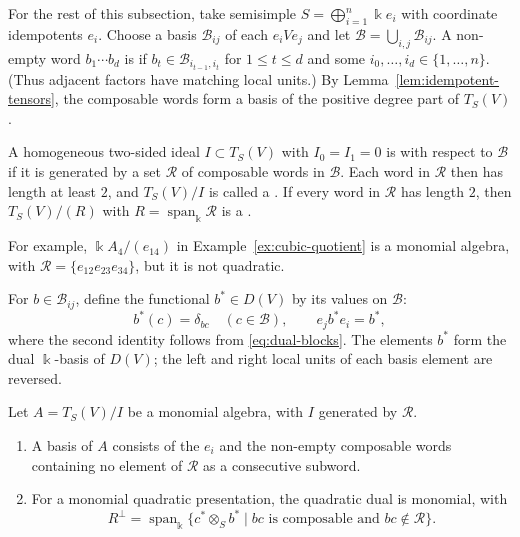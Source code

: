 For the rest of this subsection, take semisimple $S=\bigoplus_{i=1}^n\Bbbk e_i$ with coordinate idempotents $e_i$.
Choose a basis $\mathcal B_{ij}$ of each $e_iVe_j$ and let $\mathcal B=\bigcup_{i,j}\mathcal B_{ij}$.
A non-empty word $b_1\cdots b_d$ is  if $b_t\in\mathcal B_{i_{t-1},i_t}$ for $1\leq t\leq d$ and some $i_0,\ldots,i_d\in\{1,\ldots,n\}$.
(Thus adjacent factors have matching local units.)
By Lemma~\ref{lem:idempotent-tensors}, the composable words form a basis of the positive degree part of $T_S(V)$.

\begin{definition}\label{def:monomial}
A homogeneous two-sided ideal $I\subset T_S(V)$ with $I_0=I_1=0$ is  with respect to $\mathcal B$ if it is generated by a set $\mathcal R$ of composable words in $\mathcal B$.
Each word in $\mathcal R$ then has length at least $2$, and $T_S(V)/I$ is called a .
If every word in $\mathcal R$ has length $2$, then $T_S(V)/(R)$ with $R=\operatorname{span}_\Bbbk\mathcal R$ is a .
\end{definition}

For example, $\Bbbk A_4/(e_{14})$ in Example~\ref{ex:cubic-quotient} is a monomial algebra, with $\mathcal R=\{e_{12}e_{23}e_{34}\}$, but it is not quadratic.

For $b\in\mathcal B_{ij}$, define the functional $b^*\in D(V)$ by its values on $\mathcal B$:
\begin{equation}\label{eq:dual-basis-idempotents}
b^*(c)=\delta_{bc}\quad(c\in\mathcal B),
\qquad e_jb^*e_i=b^*,
\end{equation}
where the second identity follows from \eqref{eq:dual-blocks}.
The elements $b^*$ form the dual $\Bbbk$-basis of $D(V)$; the left and right local units of each basis element are reversed.

\begin{proposition}\label{prop:monomial-dual}
Let $A=T_S(V)/I$ be a monomial algebra, with $I$ generated by $\mathcal R$.
\begin{enumerate}
\item A basis of $A$ consists of the $e_i$ and the non-empty composable words containing no element of $\mathcal R$ as a consecutive subword.
\item For a monomial quadratic presentation, the quadratic dual is monomial, with
\begin{equation}\label{eq:monomial-dual}
R^\perp=\operatorname{span}_\Bbbk
\{c^*\otimes_S b^*\mid bc\text{ is composable and }bc\notin\mathcal R\}.
\end{equation}
\end{enumerate}
\end{proposition}

